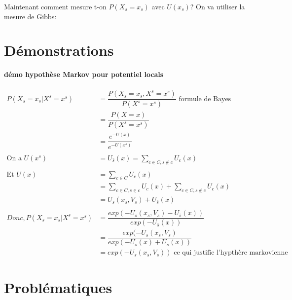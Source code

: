 \documentclass[fleqn]{article} %
\begin{document}
Maintenant comment mesure t-on $P(X_s=x_s)$ avec $U(x_s)$? On va utiliser la mesure de Gibbs:

\section{Démonstrations}
\paragraph{démo hypothèse Markov pour potentiel locals}
\[
\begin{aligned}
	P(X_s= x_s | X^s= x^s)
		&= \dfrac{P(X_s= x_s, X^s= x^s)}{P(X^s= x^s)}  \text{  formule de Bayes}\\
		&= \dfrac{P(X= x)}{P(X^s= x^s)}\\
		&= \dfrac{e^{-U(x)}}{e^{-U(x^s)} }\\	
		&\ \\ 	
	\text{On a  } U(x^s)
		&= U_{\bar{s}}(x) = \sum_{c\in C, s\notin c}{U_c(x)}\\
		&\ \\
	\text{Et  } U(x) 
		&= \sum_{c\in C}{U_c(x)}\\
		&= \sum_{c\in C, s\in c}{U_c(x)} + \sum_{c\in C, s\notin c}{U_c(x)}\\
		&= U_s(x_s,V_s) + U_{\bar{s}}(x) \\
		&\ \\
	Donc, P(X_s= x_s | X^s= x^s)
		&=\dfrac{exp(-U_s(x_s,V_s) - U_{\bar{s}}(x))}  {exp(-U_{\bar{s}}(x))}\\
		&=\dfrac{exp(-U_s(x_s,V_s)}{exp(-U_{\bar{s}}(x) + U_{\bar{s}}(x))}\\
		&=exp(-U_s(x_s,V_s))   \text{   ce qui justifie l'hypthère markovienne}
\end{aligned}
\]
\section{Problématiques}
\end{document}
